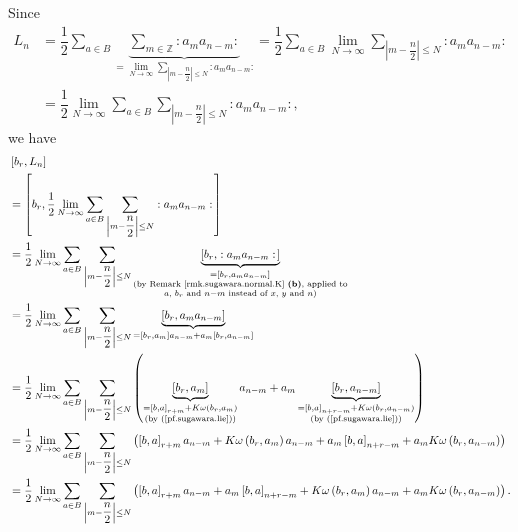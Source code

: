 \documentclass[etingof-lie.tex]{subfiles}
\begin{document}
Since%
\begin{align*}
L_{n}  &  =\dfrac{1}{2}\sum\limits_{a\in B}\underbrace{\sum\limits_{m\in
\mathbb{Z}}\left.  :a_{m}a_{n-m}:\right.  }_{=\lim\limits_{N\rightarrow\infty
}\sum\limits_{\left\vert m-\dfrac{n}{2}\right\vert \leq N}\left.
:a_{m}a_{n-m}:\right.  }=\dfrac{1}{2}\sum\limits_{a\in B}\lim
\limits_{N\rightarrow\infty}\sum\limits_{\left\vert m-\dfrac{n}{2}\right\vert
\leq N}\left.  :a_{m}a_{n-m}:\right. \\
&  =\dfrac{1}{2}\lim\limits_{N\rightarrow\infty}\sum\limits_{a\in B}%
\sum\limits_{\left\vert m-\dfrac{n}{2}\right\vert \leq N}\left.  :a_{m}%
a_{n-m}:\right.  ,
\end{align*}
we have%
\begin{align}
&  \left[  b_{r},L_{n}\right] \nonumber\\
&  =\left[  b_{r},\dfrac{1}{2}\lim\limits_{N\rightarrow\infty}\sum
\limits_{a\in B}\sum\limits_{\left\vert m-\dfrac{n}{2}\right\vert \leq
N}\left.  :a_{m}a_{n-m}:\right.  \right] \nonumber\\
&  =\dfrac{1}{2}\lim\limits_{N\rightarrow\infty}\sum\limits_{a\in B}%
\sum\limits_{\left\vert m-\dfrac{n}{2}\right\vert \leq N}\underbrace{\left[
b_{r},\left.  :a_{m}a_{n-m}:\right.  \right]  }%
_{\substack{_{\substack{=\left[  b_{r},a_{m}a_{n-m}\right]  }}\\\text{(by
Remark \ref{rmk.sugawara.normal.K} \textbf{(b)}, applied to}\\a\text{, }%
b_{r}\text{ and }n-m\text{ instead of }x\text{, }y\text{ and }n\text{)}%
}}\nonumber\\
&  =\dfrac{1}{2}\lim\limits_{N\rightarrow\infty}\sum\limits_{a\in B}%
\sum\limits_{\left\vert m-\dfrac{n}{2}\right\vert \leq N}\underbrace{\left[
b_{r},a_{m}a_{n-m}\right]  }_{=\left[  b_{r},a_{m}\right]  a_{n-m}%
+a_{m}\left[  b_{r},a_{n-m}\right]  }\nonumber\\
&  =\dfrac{1}{2}\lim\limits_{N\rightarrow\infty}\sum\limits_{a\in B}%
\sum\limits_{\left\vert m-\dfrac{n}{2}\right\vert \leq N}\left(
\underbrace{\left[  b_{r},a_{m}\right]  }_{\substack{=\left[  b,a\right]
_{r+m}+K\omega\left(  b_{r},a_{m}\right)  \\\text{(by (\ref{pf.sugawara.lie}%
))}}}a_{n-m}+a_{m}\underbrace{\left[  b_{r},a_{n-m}\right]  }%
_{\substack{=\left[  b,a\right]  _{n+r-m}+K\omega\left(  b_{r},a_{n-m}\right)
\\\text{(by (\ref{pf.sugawara.lie}))}}}\right) \nonumber\\
&  =\dfrac{1}{2}\lim\limits_{N\rightarrow\infty}\sum\limits_{a\in B}%
\sum\limits_{\left\vert m-\dfrac{n}{2}\right\vert \leq N}\left(  \left[
b,a\right]  _{r+m}a_{n-m}+K\omega\left(  b_{r},a_{m}\right)  a_{n-m}%
+a_{m}\left[  b,a\right]  _{n+r-m}+a_{m}K\omega\left(  b_{r},a_{n-m}\right)
\right) \nonumber\\
&  =\dfrac{1}{2}\lim\limits_{N\rightarrow\infty}\sum\limits_{a\in B}%
\sum\limits_{\left\vert m-\dfrac{n}{2}\right\vert \leq N}\left(  \left[
b,a\right]  _{r+m}a_{n-m}+a_{m}\left[  b,a\right]  _{n+r-m}+K\omega\left(
b_{r},a_{m}\right)  a_{n-m}+a_{m}K\omega\left(  b_{r},a_{n-m}\right)  \right)
. \label{pf.sugawara.b.1}%
\end{align}
\end{document}
